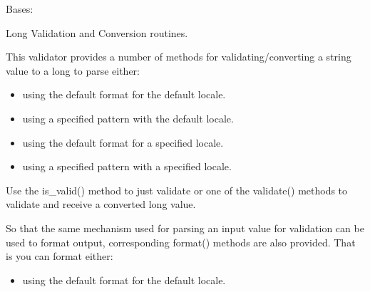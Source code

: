 \documentclass[letterpaper,10pt,english]{sphinxmanual}
\begin{document}
\begin{fulllineitems}
\label{\detokenize{apache_commons_validator_python.routines:apache_commons_validator_python.routines.long_validator.LongValidator}}
\pysigstartsignatures
{}
\pysigstopsignatures
\sphinxAtStartPar
Bases: {\hyperref[\detokenize{apache_commons_validator_python.routines:apache_commons_validator_python.routines.abstract_number_validator.AbstractNumberValidator}]{}}

\sphinxAtStartPar
Long Validation and Conversion routines.

\sphinxAtStartPar
This validator provides a number of methods for validating/converting a string value
to a long to parse either:
\begin{itemize}
\item {} 
\sphinxAtStartPar
using the default format for the default locale.

\item {} 
\sphinxAtStartPar
using a specified pattern with the default locale.

\item {} 
\sphinxAtStartPar
using the default format for a specified locale.

\item {} 
\sphinxAtStartPar
using a specified pattern with a specified locale.

\end{itemize}

\sphinxAtStartPar
Use the is\_valid() method to just validate or one of the validate() methods to
validate and receive a converted long value.

\sphinxAtStartPar
So that the same mechanism used for parsing an input value for validation can be used to format output,
corresponding format() methods are also provided. That is you can format either:
\begin{itemize}
\item {} 
\sphinxAtStartPar
using the default format for the default locale.


\end{itemize}
\end{fulllineitems}
\end{document}

